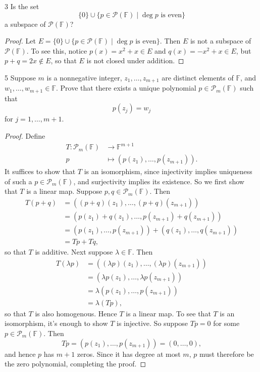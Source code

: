 \documentclass{extarticle}
\newenvironment{problem}[1]{\begin{prob*}{#1}{}}{\end{prob*}}
\newcommand{\F}{\mathbb{F}}
\newcommand{\poly}{\mathcal{P}}
\begin{document}
\begin{problem}{3}
Is the set
\begin{equation*}
\{0\} \cup \{p\in\poly(\F)\mid \deg p\text{ is even}\}
\end{equation*}
a subspace of $\poly(\F)$?
\end{problem}
\begin{proof}
Let $E = \{0\} \cup \{p\in\poly(\F)\mid \deg p\text{ is even}\}$.  Then $E$ is not a subspace of $\poly(\F)$.  To see this, notice $p(x) = x^2 + x\in E$ and $q(x) = -x^2 + x\in E$, but $p + q = 2x\not\in E$, so that $E$ is not closed under addition.
\end{proof}

\begin{problem}{5}
Suppose $m$ is a nonnegative integer, $z_1,\dots, z_{m+1}$ are distinct elements of $\F$, and $w_1,\dots, w_{m+1}\in\F$.  Prove that there exists a unique polynomial $p\in\poly_m(\F)$ such that 
\begin{equation*}
p(z_j) = w_j
\end{equation*}
for $j = 1,\dots,m+1$.  
\end{problem}
\begin{proof}
Define 
\begin{align*}
T:\poly_m(\F)&\to \F^{m + 1}\\
    p &\mapsto (p(z_1), \dots, p(z_{m+1})).
\end{align*}
It suffices to show that $T$ is an isomorphism, since injectivity implies uniqueness of such a $p\in\poly_m(\F)$, and surjectivity implies its existence.  So we first show that $T$ is a linear map.  Suppose $p,q\in\poly_m(\F)$.  Then
\begin{align*}
T(p + q) &= \left((p + q)(z_1), \dots, (p + q)(z_{m+1})\right)\\
&= \left(p(z_1) + q(z_1), \dots, p(z_{m+1}) + q(z_{m+1})\right)\\
&= \left(p(z_1), \dots, p(z_{m+1})\right) + \left(q(z_1), \dots, q(z_{m+1})\right)\\
&= Tp + Tq,
\end{align*}
so that $T$ is additive.  Next suppose $\lambda\in\F$.  Then
\begin{align*}
T(\lambda p) &= \left((\lambda p)(z_1), \dots, (\lambda p)(z_{m+1})\right)\\
&= \left(\lambda p(z_1), \dots, \lambda p(z_{m+1})\right)\\
&= \lambda \left(p(z_1), \dots, p(z_{m+1})\right)\\
&= \lambda (Tp),
\end{align*}
so that $T$ is also homogenous.  Hence $T$ is a linear map.  To see that $T$ is an isomorphism, it's enough to show $T$ is injective.  So suppose $Tp = 0$ for some $p\in\poly_m(\F)$.  Then
\begin{equation*}
Tp = \left(p(z_1), \dots, p(z_{m+1})\right) = (0, \dots, 0),
\end{equation*}
and hence $p$ has $m + 1$ zeros.  Since it has degree at most $m$, $p$ must therefore be the zero polynomial, completing the proof.
\end{proof}
\end{document}
